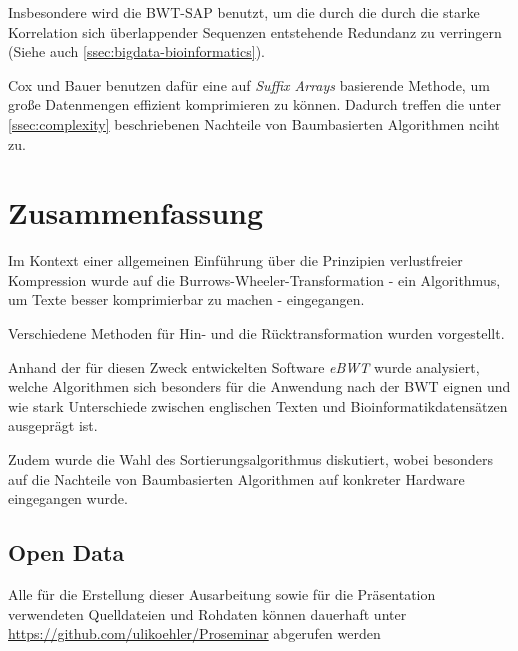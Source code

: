 \documentclass[ngerman,pdftex,paper=A4,DIV=calc,titlepage,12pt]{scrartcl}
\newtheorem[L]{boxedDefinition}{Definition}
\begin{document}
Insbesondere wird die BWT-SAP benutzt, um die durch die durch die starke Korrelation sich überlappender Sequenzen entstehende Redundanz zu verringern (Siehe auch \vref{ssec:bigdata-bioinformatics}).

Cox und Bauer benutzen dafür eine auf \textit{Suffix Arrays} basierende Methode, um große Datenmengen effizient komprimieren zu können. Dadurch treffen die unter \vref{ssec:complexity} beschriebenen Nachteile von Baumbasierten Algorithmen nciht zu.
\section{Zusammenfassung}
Im Kontext einer allgemeinen Einführung über die Prinzipien verlustfreier Kompression wurde auf die Burrows-Wheeler-Transformation - ein Algorithmus, um Texte besser komprimierbar zu machen - eingegangen.

\noindent Verschiedene Methoden für Hin- und die Rücktransformation wurden vorgestellt. 

Anhand der für diesen Zweck entwickelten Software \textit{eBWT} wurde analysiert, welche Algorithmen sich besonders für die Anwendung nach der BWT eignen und wie stark Unterschiede zwischen englischen Texten und Bioinformatikdatensätzen ausgeprägt ist.

Zudem wurde die Wahl des Sortierungsalgorithmus diskutiert, wobei besonders auf die Nachteile von Baumbasierten Algorithmen auf konkreter Hardware eingegangen wurde.
\renewcommand\refname{Literatur- und Quellenverzeichnis}


\subsection*{Open Data}\label{opendata}
Alle für die Erstellung dieser Ausarbeitung sowie für die Präsentation verwendeten Quelldateien und Rohdaten können dauerhaft unter \url{https://github.com/ulikoehler/Proseminar} abgerufen werden
\end{document}
